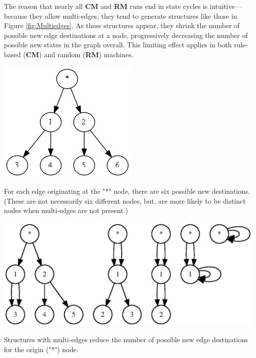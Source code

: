 \documentclass{tufte-handout}
\begin{document}
The reason that nearly all \textbf{CM} and \textbf{RM} runs end in state cycles is
intuitive---because they allow multi-edges, they tend to generate structures
like those in Figure \ref{fig:Multiedges}. As these structures appear, they 
shrink the number of possible new edge destinations at a node, progressively decreasing the
number of possible new states in the graph overall. This limiting effect
applies in both rule-based (\textbf{CM}) and random (\textbf{RM}) machines.

\begin{marginfigure}
\includegraphics[scale=0.3]{sixchoices.png}
\caption{For each edge originating at the "*" node, there are six possible new destinations. (These
are not necessarily six different nodes, but, are more likely to be distinct nodes when
multi-edges are not present.)}
\label{fig:Sixnumbered}
\end{marginfigure}

\begin{marginfigure}
\vspace{2mm}
\includegraphics{multiedges.ps}
\caption{Structures with multi-edges reduce the number of possible new edge destinations for
the origin ("*") node.}
\label{fig:Multiedges}
\end{marginfigure}

\clearpage
\end{document}
